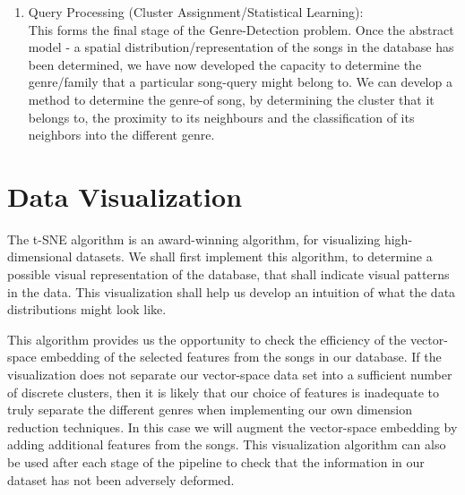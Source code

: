 \documentclass[12pt]{article}
\begin{document}
\begin{enumerate}
\item Query Processing (Cluster Assignment/Statistical Learning):\\
This forms the final stage of the Genre-Detection problem. Once the abstract model - a spatial distribution/representation of the songs in the database has been determined, we have now developed the capacity to determine the genre/family that a particular song-query might belong to. We can develop a method to determine the genre-of song, by determining the cluster that it belongs to, the proximity to its neighbours and the classification of its neighbors into the different genre. 


\end{enumerate}


\section{Data Visualization}
The t-SNE algorithm \cite{tSNEdataViz} is an award-winning algorithm, for visualizing high-dimensional datasets. We shall first implement this algorithm, to determine a possible visual representation of the database, that shall indicate visual patterns in the data. This visualization shall help us develop an intuition of what the data distributions might look like. 

This algorithm provides us the opportunity to check the efficiency of the vector-space embedding of the selected features from the songs in our database.  If the visualization does not separate our vector-space data set into a sufficient number of discrete clusters, then it is likely that our choice of features is inadequate to truly separate the different genres when implementing our own dimension reduction techniques.  In this case we will augment the vector-space embedding by adding additional features from the songs.  This visualization algorithm can also be used after each stage of the pipeline to check that the information in our dataset has not been adversely deformed.
\end{document}
